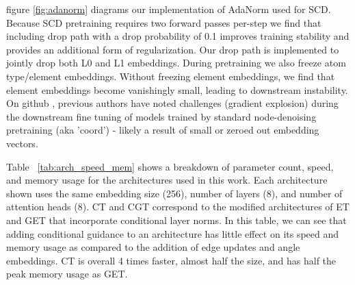 figure \ref{fig:adanorm} diagrams our implementation of AdaNorm used for SCD. Because SCD pretraining requires two forward passes per-step we find that including drop path with a drop probability of 0.1 improves training stability and provides an additional form of regularization. Our drop path is implemented to jointly drop both L0 and L1 embeddings. During pretraining we also freeze atom type/element embeddings. Without freezing element embeddings, we find that element embeddings become vanishingly small, leading to downstream instability. On github \cite{UnstableCoord_Zaidi2023GitHubIssue}, previous authors have noted challenges (gradient explosion) during the downstream fine tuning of models trained by standard node-denoising pretraining (aka 'coord') - likely a result of small or zeroed out embedding vectors.


Table ~\ref{tab:arch_speed_mem} shows a breakdown of parameter count, speed, and memory usage for the architectures used in this work. Each architecture shown uses the same embedding size (256), number of layers (8), and number of attention heads (8). CT and CGT correspond to the modified architectures of ET and GET that incorporate conditional layer norms. In this table, we can see that adding conditional guidance to an architecture has little effect on its speed and memory usage as compared to the addition of edge updates and angle embeddings. CT is overall 4 times faster, almost half the size, and has half the peak memory usage as GET. 


